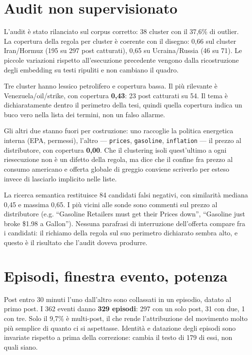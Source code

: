 \documentclass[11pt,a4paper]{article}
\begin{document}
\section{Audit non supervisionato}

L'audit è stato rilanciato sul corpus corretto: 38 cluster con il
37,6\% di outlier. La copertura della regola per cluster è coerente con il
disegno: 0,66 sul cluster Iran/Hormuz (195 su 297 post catturati), 0,65 su
Ucraina/Russia (46 su 71). Le piccole variazioni rispetto all'esecuzione
precedente vengono dalla ricostruzione degli embedding su testi ripuliti e non
cambiano il quadro.

Tre cluster hanno lessico petrolifero e copertura bassa. Il più rilevante è
Venezuela/\allowbreak oil/\allowbreak strike, con copertura \textbf{0,43}: 23
post catturati su 54. Il tema è dichiaratamente dentro il perimetro della
tesi, quindi quella copertura indica un buco vero nella lista dei termini, non
un falso allarme.

Gli altri due stanno fuori per costruzione: uno raccoglie la politica
energetica interna (EPA, permessi), l'altro — \texttt{prices},
\texttt{gasoline}, \texttt{inflation} — il prezzo al distributore, con
copertura \textbf{0,00}. Che il clustering isoli quest'ultimo a ogni
riesecuzione non è un difetto della regola, ma dice che il confine fra prezzo
al consumo americano e offerta globale di greggio conviene scriverlo per
esteso invece di lasciarlo implicito nelle liste.

La ricerca semantica restituisce 84 candidati falsi negativi, con similarità
mediana 0,45 e massima 0,65. I più vicini alle sonde sono commenti sul prezzo
al distributore (e.g. ``Gasoline Retailers must get their Prices down'',
``Gasoline just broke \$1.98 a Gallon''). Nessuna
parafrasi di interruzione dell'offerta compare fra i candidati: il richiamo
della regola sul suo perimetro dichiarato sembra alto, e questo è il risultato
che l'audit doveva produrre.

\section{Episodi, finestra evento, potenza}

Post entro 30 minuti l'uno dall'altro sono collassati in un episodio, datato
al primo post. I 362 eventi danno \textbf{329 episodi}: 297 con un solo post,
31 con due, 1 con tre. Solo il 9,7\% è multi-post, il che rende
l'attribuzione del movimento molto più semplice di quanto ci si aspettasse.
Identità e datazione degli episodi sono invariate rispetto a prima della
correzione: cambia il testo di 179 di essi, non quali siano.
\end{document}
